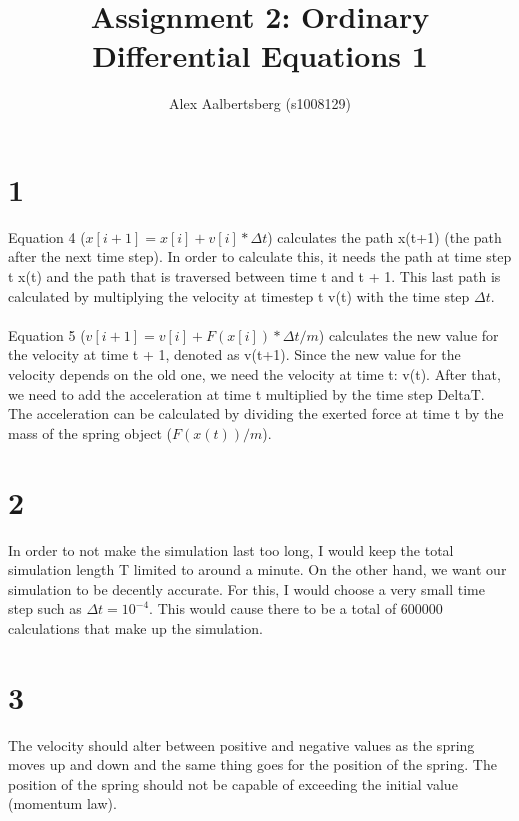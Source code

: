 \documentclass[12pt, a4paper]{article}
\begin{document}
	\author{Alex Aalbertsberg (s1008129)}	
	\title{Assignment 2: Ordinary Differential Equations 1}
	\maketitle
	\part*{1}
	Equation 4 ($x[i+1] = x[i] + v[i] * \Delta t$) calculates the path x(t+1) (the path after the next time step). In order to calculate this, it needs the path at time step t x(t) and the path that is traversed between time t and t + 1. This last path is calculated by multiplying the velocity at timestep t v(t) with the time step $\Delta t$.\\\\
	Equation 5 ($v[i+1] = v[i] + F(x[i])*\Delta t/m$) calculates the new value for the velocity at time t + 1, denoted as v(t+1). Since the new value for the velocity depends on the old one, we need the velocity at time t: v(t). After that, we need to add the acceleration at time t multiplied by the time step DeltaT. The acceleration can be calculated by dividing the exerted force at time t by the mass of the spring object ($F(x(t))/m$).
	\part*{2}
	In order to not make the simulation last too long, I would keep the total simulation length T limited to around a minute. On the other hand, we want our simulation to be decently accurate. For this, I would choose a very small time step such as $\Delta t = 10^{-4}$. This would cause there to be a total of 600000 calculations that make up the simulation.
	\part*{3}
	The velocity should alter between positive and negative values as the spring moves up and down  and the same thing goes for the position of the spring. The position of the spring should not be capable of exceeding the initial value (momentum law).
\end{document}
